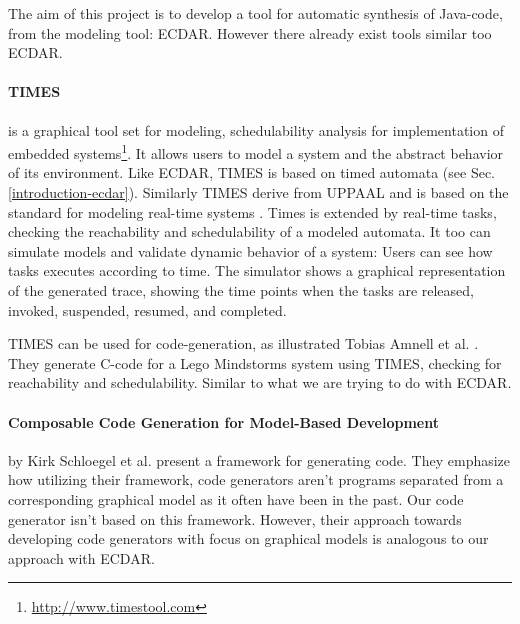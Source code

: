 The aim of this project is to develop a tool for automatic synthesis of
Java-code, from the modeling tool: ECDAR. However there already exist tools
similar too ECDAR.

\paragraph{TIMES} is a graphical tool set for modeling, schedulability analysis
for implementation of embedded
systems\footnote{\url{http://www.timestool.com}}. It allows users to model a
system and the abstract behavior of its environment. Like ECDAR, TIMES is based
on timed automata (see Sec. \ref{introduction-ecdar}). Similarly TIMES derive
from UPPAAL and is based on the standard for modeling real-time
systems \cite{Alur1994:183}.  Times is extended by real-time tasks, checking the
reachability and schedulability of a modeled automata. It too can simulate
models and validate dynamic behavior of a system: Users can see how tasks
executes according to time. The simulator shows a graphical representation of
the generated trace, showing the time points when the tasks are released,
invoked, suspended, resumed, and completed.

TIMES can be used for code-generation, as illustrated Tobias Amnell et
al. \cite{Amnell:2002:CST:779110.779112}. They generate C-code for a Lego
Mindstorms system using TIMES, checking for reachability and
schedulability. Similar to what we are trying to do with ECDAR.


\paragraph{Composable Code Generation for Model-Based Development}
by Kirk Schloegel et al. present a framework for generating
code\cite{composable-code-generation}. They emphasize how utilizing their
framework, code generators aren't programs separated from a corresponding
graphical model as it often have been in the past. Our code generator isn't
based on this framework. However, their approach towards developing code generators
with focus on graphical models is analogous to our approach with ECDAR.

